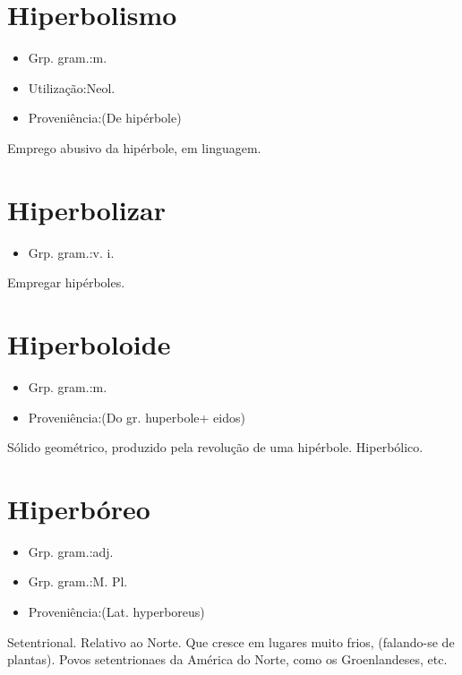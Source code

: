\documentclass{article}
\begin{document}
\section{Hiperbolismo}
\begin{itemize}
\item {Grp. gram.:m.}
\end{itemize}
\begin{itemize}
\item {Utilização:Neol.}
\end{itemize}
\begin{itemize}
\item {Proveniência:(De \textunderscore hipérbole\textunderscore )}
\end{itemize}
Emprego abusivo da hipérbole, em linguagem.
\section{Hiperbolizar}
\begin{itemize}
\item {Grp. gram.:v. i.}
\end{itemize}
Empregar hipérboles.
\section{Hiperboloide}
\begin{itemize}
\item {Grp. gram.:m.}
\end{itemize}
\begin{itemize}
\item {Proveniência:(Do gr. \textunderscore huperbole\textunderscore  + \textunderscore eidos\textunderscore )}
\end{itemize}
Sólido geométrico, produzido pela revolução de uma hipérbole.
Hiperbólico.
\section{Hiperbóreo}
\begin{itemize}
\item {Grp. gram.:adj.}
\end{itemize}
\begin{itemize}
\item {Grp. gram.:M. Pl.}
\end{itemize}
\begin{itemize}
\item {Proveniência:(Lat. \textunderscore hyperboreus\textunderscore )}
\end{itemize}
Setentrional.
Relativo ao Norte.
Que cresce em lugares muito frios, (falando-se de plantas).
Povos setentrionaes da América do Norte, como os Groenlandeses, etc.
\end{document}
